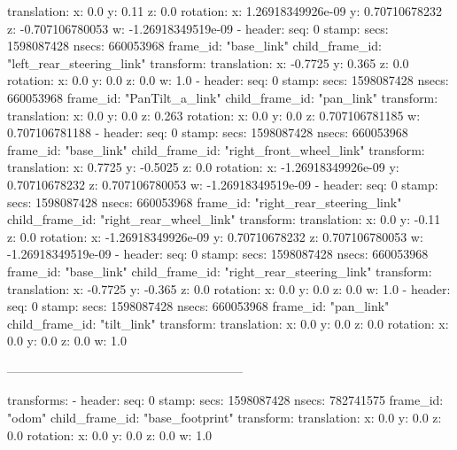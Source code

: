       translation: 
        x: 0.0
        y: 0.11
        z: 0.0
      rotation: 
        x: 1.26918349926e-09
        y: 0.70710678232
        z: -0.707106780053
        w: -1.26918349519e-09
  - 
    header: 
      seq: 0
      stamp: 
        secs: 1598087428
        nsecs: 660053968
      frame_id: "base_link"
    child_frame_id: "left_rear_steering_link"
    transform: 
      translation: 
        x: -0.7725
        y: 0.365
        z: 0.0
      rotation: 
        x: 0.0
        y: 0.0
        z: 0.0
        w: 1.0
  - 
    header: 
      seq: 0
      stamp: 
        secs: 1598087428
        nsecs: 660053968
      frame_id: "PanTilt_a_link"
    child_frame_id: "pan_link"
    transform: 
      translation: 
        x: 0.0
        y: 0.0
        z: 0.263
      rotation: 
        x: 0.0
        y: 0.0
        z: 0.707106781185
        w: 0.707106781188
  - 
    header: 
      seq: 0
      stamp: 
        secs: 1598087428
        nsecs: 660053968
      frame_id: "base_link"
    child_frame_id: "right_front_wheel_link"
    transform: 
      translation: 
        x: 0.7725
        y: -0.5025
        z: 0.0
      rotation: 
        x: -1.26918349926e-09
        y: 0.70710678232
        z: 0.707106780053
        w: -1.26918349519e-09
  - 
    header: 
      seq: 0
      stamp: 
        secs: 1598087428
        nsecs: 660053968
      frame_id: "right_rear_steering_link"
    child_frame_id: "right_rear_wheel_link"
    transform: 
      translation: 
        x: 0.0
        y: -0.11
        z: 0.0
      rotation: 
        x: -1.26918349926e-09
        y: 0.70710678232
        z: 0.707106780053
        w: -1.26918349519e-09
  - 
    header: 
      seq: 0
      stamp: 
        secs: 1598087428
        nsecs: 660053968
      frame_id: "base_link"
    child_frame_id: "right_rear_steering_link"
    transform: 
      translation: 
        x: -0.7725
        y: -0.365
        z: 0.0
      rotation: 
        x: 0.0
        y: 0.0
        z: 0.0
        w: 1.0
  - 
    header: 
      seq: 0
      stamp: 
        secs: 1598087428
        nsecs: 660053968
      frame_id: "pan_link"
    child_frame_id: "tilt_link"
    transform: 
      translation: 
        x: 0.0
        y: 0.0
        z: 0.0
      rotation: 
        x: 0.0
        y: 0.0
        z: 0.0
        w: 1.0
 
 
 --------------------------------------------------------- 
 
 
 transforms: 
  - 
    header: 
      seq: 0
      stamp: 
        secs: 1598087428
        nsecs: 782741575
      frame_id: "odom"
    child_frame_id: "base_footprint"
    transform: 
      translation: 
        x: 0.0
        y: 0.0
        z: 0.0
      rotation: 
        x: 0.0
        y: 0.0
        z: 0.0
        w: 1.0